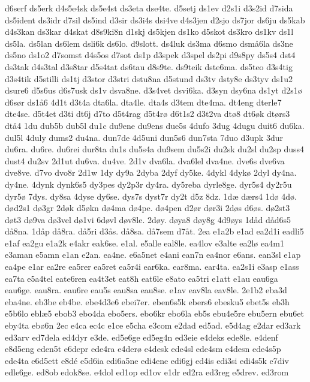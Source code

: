 {d6serf
ds5erk
d4s5e4sk
ds5e4st
ds3eta
dse4te.
d5setj
ds1ev
d2s1i
d3s2id
d7sida
ds5ident
ds3idr
d7sil
ds5ind
d3sir
ds3i4s
dsi4ve
d4s3jen
d2sjo
ds7jor
ds6ju
ds5kab
d4s3kan
ds3kar
d4skat
d8s9ki8n
d1skj
ds5kjen
ds1ko
d5skot
ds3kro
ds1kv
ds1l
ds5la.
ds5lan
ds6lem
dsli6k
ds6lo.
d9slott.
ds4luk
ds3ma
d6smo
dsm^^e56la
ds3ne
ds5no
ds1o2
d7somst
d4s5os
d7sot
ds1p
d3spek
d3spel
ds2pi
d9s8py
ds5s4
dst4
ds3tak
d4s3tal
d3s8tar
d5s4tat
ds6tau
d8s9te.
ds9teik
dste6ma.
ds5teo
d3s4tig
d3s4tik
d5stilli
ds1tj
d3stor
d3stri
dstu8na
d5stund
ds3tv
dsty8e
ds3tyv
ds1u2
dsure6
d5s6us
d6s7usk
ds1v
dsva8ne.
d3s4vet
dsvi6ka.
d3syn
dsy6na
ds1yt
d2s1^^f8
d6s^^f8r
ds1^^e56
4d1t
d3t4a
dta6la.
dta4le.
dta4s
d3tem
dte4ma.
dt4eng
dterle7
dte4se.
d5t4et
d3ti
dt6j
d7to
d5t4rag
d5t4r^^f8
d6t1s2
d3t2va
dt^^f88
dt6^^f8k
dt^^f8rs3
dt^^e54
1du
dub5b
dub5l
du1c
du9ene
du9ens
due5s
4dufo
3dug
4dugu
duit6
du6ka.
dul5l
4duly
dums2
du4na.
dun7de
4d5uni
dun5s6
dun7sta
7duo
d3upk
3dur
du6ra.
du6re.
du6rei
dur8ta
du1s
du5s4a
du9sem
du5s2i
du2sk
du2sl
du2sp
duss4
dust4
du2sv
2d1ut
du6va.
du4ve.
2d1v
dva6la.
dva6lel
dva4ne.
dve6s
dve6va
dve8ve.
d7vo
dvo8r
2d1w
1dy
dy9a
2dyba
2dyf
dy5ke.
4dykl
4dyk^^f8
2dyl
dy4na.
dy4ne.
4dynk
dynk6s5
dy3pes
dy2p3r
dy4ra.
dy5reba
dyrle8ge.
dyr5s4
dy2r5u
dyr5^^f8
7dys.
dy8sa
4dyse
dy6se.
dys7s
dyst7r
dy2t
d5z
8dz.
1d^^e6
d^^e6rs4
1d^^f8
4d^^f8.
d^^f8d2s1
d^^f83gr
2d^^f8k
d5^^f8kn
d^^f84ma
d^^f84pe.
d^^f84pen
d2^^f8r
d^^f8r3i
2d^^f8s
d6^^f8s.
d^^f82st3
d^^f8t3
d^^f89va
d^^f83vel
d^^f81vi
6d^^f8vl
d^^f8v8le.
2d^^f8y.
d^^f8ya8
d^^f8y8g
4d9^^f8ys
1d^^e5d
d^^e5d6s5
d^^e58na.
1d^^e5p
d^^e58ra.
d^^e55ri
d3^^e5s.
d^^e58sa.
d^^e57sem
d7^^e5t.
2ea
e1a2b
e1ad
ea2d1i
eadli5
e1af
ea2gu
e1a2k
e4akr
eak6se.
e1al.
e5alle
eal8le.
ea4lov
e3alte
ea2l^^f8
ea4m1
e3aman
e5amn
e1an
e2an.
ea4ne.
e6a5net
e4ani
ean7n
ea4nor
e6ans.
ean3sl
e1ap
ea4pe
e1ar
ea2re
ea5rer
ea5ret
ea5r4i
ear6ka.
ear8ma.
ear4ta.
ea2s1i
e3asp
e1ass
ea7ta
e5a4tel
eate6ren
ea4t3et
eat8h
eat6le
e8ato
ea5tri
e1att
e1au
eau6ga
eau6ge.
eau8ra.
eau6re
eau5s
eau8sa
eau8se.
e1av
eav8la
eav8le.
2e1b2
eba3d
eba4ne.
eb3be
eb4be.
ebe4d3e6
ebei7er.
eben6s5k
ebers6
ebesku5
ebet5s
eb3h
e5b6lo
ebl^^e65
ebob3
ebo4da
ebo5ers.
ebo6kr
ebo6la
eb5s
ebu4e5re
ebu5ern
ebu6et
eby4ta
eb^^f86n
2ec
e4ca
ec4c
e1ce
e5cha
e3com
e2dad
ed5ad.
e5d4ag
e2dar
ed3ark
ed3arv
ed7dela
ed4dyr
e3de.
ed5e6ge
ed5eg4n
ed3eie
e4deks
ede8le.
e4denf
e8d5eng
eden5t
e6depr
ede4ra
e4der^^f8
e4desk
ede4sl
ede4sm
e4desn
ede4s5p
ede4ta
e6d5ett
e8d^^e9
e5d6ia
edi6a5ne
edi4ene
edi6gj
ed4is
edi3si
edi4s5k
e7div
edle6ge.
ed8ob
edok8se.
e4dol
ed1op
ed1ov
e1dr
ed2ra
ed3reg
e5drev.
ed3rom
}
